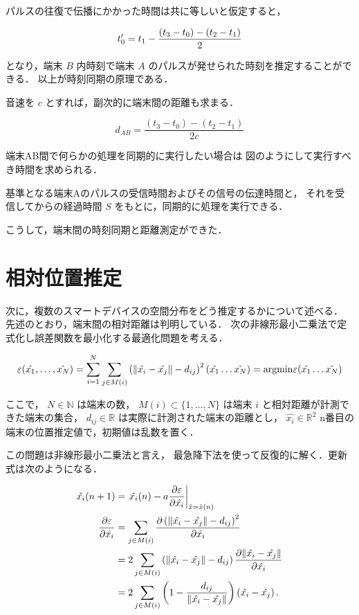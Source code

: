 
パルスの往復で伝播にかかった時間は共に等しいと仮定すると，

$$
t_0' = t_1 - \frac{(t_3 - t_0) - (t_2 - t_1)}{2} \\
$$

となり，端末 $B$ 内時刻で端末 $A$ のパルスが発せられた時刻を推定することができる．
以上が時刻同期の原理である．

音速を $c$ とすれば，副次的に端末間の距離も求まる．

$$
d_{AB} = \frac{(t_3 - t_0) - (t_2 - t_1)}{2c}
$$

端末AB間で何らかの処理を同期的に実行したい場合は
図のようにして実行すべき時間を求められる．


基準となる端末Aのパルスの受信時間およびその信号の伝達時間と，
それを受信してからの経過時間 $S$ をもとに，同期的に処理を実行できる．

こうして，端末間の時刻同期と距離測定ができた．

\section{相対位置推定}


次に，複数のスマートデバイスの空間分布をどう推定するかについて述べる．
先述のとおり，端末間の相対距離は判明している．
次の非線形最小二乗法で定式化し誤差関数を最小化する最適化問題を考える．

$$
\varepsilon(\hat{x_1}, \dots, \hat{x_N}) = \sum_{i=1}^N \sum_{j\in M(i)} \left( \| \hat{ x_i } - \hat{ x_j } \| - d_{ij} \right)^2 \\
(\hat{x_1} \dots \hat{x_N}) = \mathrm{argmin} \varepsilon(\hat{x_1} \dots \hat{x_N})
$$

ここで，
$N \in \mathbb{N}$ は端末の数，
$M(i) \subset \{1,\dots,N\}$ は端末 $i$ と相対距離が計測できた端末の集合，
$d_{ij} \in \mathbb{R}$ は実際に計測された端末の距離とし，
$\hat{ x_i } \in \mathbb{R}^2$ n番目の端末の位置推定値で，初期値は乱数を置く．

この問題は非線形最小二乗法と言え，
最急降下法を使って反復的に解く．更新式は次のようになる．

$$\begin{aligned}
\hat{x_i} (n + 1) & = \left. \hat{x_i} (n) - a \frac{\partial \varepsilon}{\partial \hat{x_i}} \right|_{\hat{x} = \hat{x}(n)} \\
\frac{\partial \varepsilon}{\partial \hat{x_i}}
&= \sum_{j\in M(i)} \frac{\partial \left( \|\hat{ x_i } - \hat{ x_j }\| - d_{ij} \right)^2}{\partial \hat{x_i}} \notag\\
&= 2 \sum_{j\in M(i)} \left( \| \hat{x_i} - \hat{x_j} \| - d_{ij} \right) \frac{\partial \| \hat{x_i} - \hat{x_j} \|}{\partial \hat{x_i}} \notag\\
&= 2 \sum_{j\in M(i)} \left( 1 - \frac{d_{ij}}{\| \hat{x_i} - \hat{x_j} \|} \right) \left( \hat{x_i} - \hat{x_j} \right).
\end{aligned}$$

